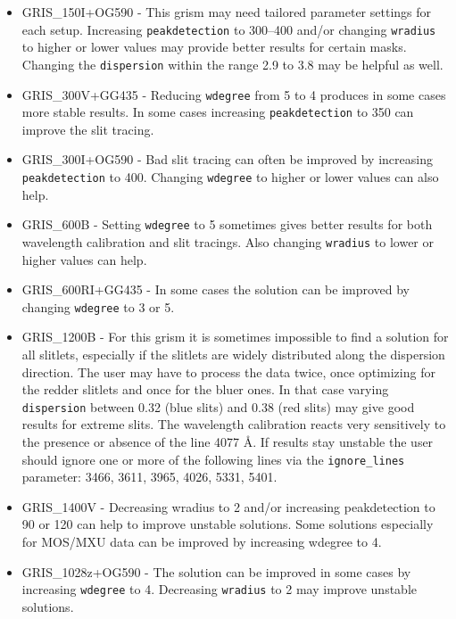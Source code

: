 \begin{itemize}
\item GRIS\_150I+OG590 - This grism may need tailored parameter settings for each setup. Increasing {\tt peakdetection} to 300–400 and/or changing {\tt wradius} to higher or lower values may provide better results for certain masks. Changing the {\tt dispersion} within the range 2.9 to 3.8 may be helpful as well.

\item GRIS\_300V+GG435 - Reducing {\tt wdegree} from 5 to 4 produces in some cases more stable results. In some cases increasing {\tt peakdetection} to 350 can improve the slit tracing.

\item GRIS\_300I+OG590 - Bad slit tracing can often be improved by increasing {\tt peakdetection} to 400. Changing {\tt wdegree} to higher or lower values can also help.

\item GRIS\_600B - Setting {\tt wdegree} to 5 sometimes gives better results for both wavelength calibration and slit tracings. Also changing {\tt wradius} to lower or higher values can help.

\item GRIS\_600RI+GG435 - In some cases the solution can be improved by changing {\tt wdegree} to 3 or 5.

\item GRIS\_1200B - For this grism it is sometimes impossible to find a solution for all slitlets, especially if the slitlets are widely distributed along the dispersion direction. The user may have to process the data twice, once optimizing for the redder slitlets and once for the bluer ones. In that case varying {\tt dispersion} between 0.32 (blue slits) and 0.38 (red slits) may give good results for extreme slits. The wavelength calibration reacts very sensitively to the presence or absence of the line 4077 Å. If results stay unstable the user should ignore one or more of the following lines via the {\tt ignore\_lines} parameter: 3466, 3611, 3965, 4026, 5331, 5401.

\item GRIS\_1400V - Decreasing wradius to 2 and/or increasing peakdetection to 90 or 120 can help to improve unstable solutions. Some solutions especially for MOS/MXU data can be improved by increasing wdegree to 4.

\item GRIS\_1028z+OG590 - The solution can be improved in some cases by increasing {\tt wdegree} to 4. Decreasing {\tt wradius} to 2 may improve unstable solutions.

\end{itemize}

